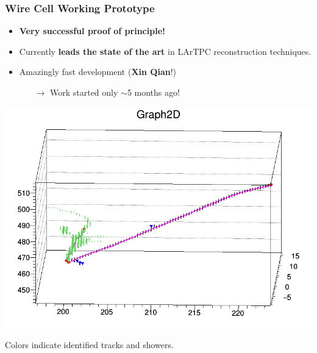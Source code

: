 \documentclass[xcolor=dvipsnames]{beamer}
\begin{document}
\begin{frame}
  \frametitle{Wire Cell Working Prototype}
  \footnotesize

  \begin{itemize}
  \item \textbf{Very successful proof of principle!}
  \item Currently \textbf{leads the state of the art} in LArTPC
    reconstruction techniques.
  \item Amazingly fast development (\textbf{Xin Qian}!)
    \begin{itemize}\scriptsize
    \item[$\rightarrow$] Work started only $\sim$5 months ago!
    \end{itemize}
  \end{itemize}

  \begin{center}
    \includegraphics[height=0.5\textheight,trim=0cm 0cm 0cm 2cm,clip]{xin-shower.png}

    \scriptsize
    Colors indicate identified tracks and showers.
  \end{center}

\end{frame}
\end{document}
